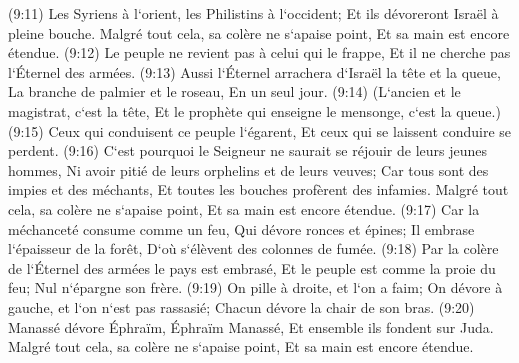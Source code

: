 \verse (9:11) Les Syriens à l`orient, les Philistins à l`occident; Et ils dévoreront Israël à pleine bouche. Malgré tout cela, sa colère ne s`apaise point, Et sa main est encore étendue. 
\verse (9:12) Le peuple ne revient pas à celui qui le frappe, Et il ne cherche pas l`Éternel des armées. 
\verse (9:13) Aussi l`Éternel arrachera d`Israël la tête et la queue, La branche de palmier et le roseau, En un seul jour. 
\verse (9:14) (L`ancien et le magistrat, c`est la tête, Et le prophète qui enseigne le mensonge, c`est la queue.) 
\verse (9:15) Ceux qui conduisent ce peuple l`égarent, Et ceux qui se laissent conduire se perdent. 
\verse (9:16) C`est pourquoi le Seigneur ne saurait se réjouir de leurs jeunes hommes, Ni avoir pitié de leurs orphelins et de leurs veuves; Car tous sont des impies et des méchants, Et toutes les bouches profèrent des infamies. Malgré tout cela, sa colère ne s`apaise point, Et sa main est encore étendue. 
\verse (9:17) Car la méchanceté consume comme un feu, Qui dévore ronces et épines; Il embrase l`épaisseur de la forêt, D`où s`élèvent des colonnes de fumée. 
\verse (9:18) Par la colère de l`Éternel des armées le pays est embrasé, Et le peuple est comme la proie du feu; Nul n`épargne son frère. 
\verse (9:19) On pille à droite, et l`on a faim; On dévore à gauche, et l`on n`est pas rassasié; Chacun dévore la chair de son bras. 
\verse (9:20) Manassé dévore Éphraïm, Éphraïm Manassé, Et ensemble ils fondent sur Juda. Malgré tout cela, sa colère ne s`apaise point, Et sa main est encore étendue. 

